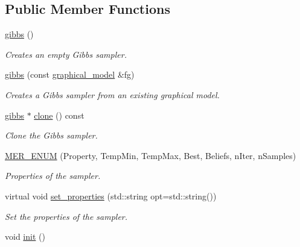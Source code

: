 \subsection*{Public Member Functions}
\begin{DoxyCompactItemize}
\item 
\hypertarget{classmerlin_1_1gibbs_a1513d2c6b58be4e4dd0e31c66d948e20}{}\hyperlink{classmerlin_1_1gibbs_a1513d2c6b58be4e4dd0e31c66d948e20}{gibbs} ()\label{classmerlin_1_1gibbs_a1513d2c6b58be4e4dd0e31c66d948e20}

\begin{DoxyCompactList}\small\item\em Creates an empty Gibbs sampler. \end{DoxyCompactList}\item 
\hypertarget{classmerlin_1_1gibbs_accbce95053cf0e18167d863ca9d3b832}{}\hyperlink{classmerlin_1_1gibbs_accbce95053cf0e18167d863ca9d3b832}{gibbs} (const \hyperlink{classmerlin_1_1graphical__model}{graphical\+\_\+model} \&fg)\label{classmerlin_1_1gibbs_accbce95053cf0e18167d863ca9d3b832}

\begin{DoxyCompactList}\small\item\em Creates a Gibbs sampler from an existing graphical model. \end{DoxyCompactList}\item 
\hyperlink{classmerlin_1_1gibbs}{gibbs} $\ast$ \hyperlink{classmerlin_1_1gibbs_a3479cca656a53a22c32ecdaa1a010308}{clone} () const 
\begin{DoxyCompactList}\small\item\em Clone the Gibbs sampler. \end{DoxyCompactList}\item 
\hypertarget{classmerlin_1_1gibbs_ad5abcb247d1b175e7feb503654dcf047}{}\hyperlink{classmerlin_1_1gibbs_ad5abcb247d1b175e7feb503654dcf047}{M\+E\+R\+\_\+\+E\+N\+U\+M} (Property, Temp\+Min, Temp\+Max, Best, Beliefs, n\+Iter, n\+Samples)\label{classmerlin_1_1gibbs_ad5abcb247d1b175e7feb503654dcf047}

\begin{DoxyCompactList}\small\item\em Properties of the sampler. \end{DoxyCompactList}\item 
virtual void \hyperlink{classmerlin_1_1gibbs_ab3981d10b8a378c2979a1dbb58893df1}{set\+\_\+properties} (std\+::string opt=std\+::string())
\begin{DoxyCompactList}\small\item\em Set the properties of the sampler. \end{DoxyCompactList}\item 
\hypertarget{classmerlin_1_1gibbs_ac14684f895fc27b59f318632a786acb7}{}void \hyperlink{classmerlin_1_1gibbs_ac14684f895fc27b59f318632a786acb7}{init} ()\label{classmerlin_1_1gibbs_ac14684f895fc27b59f318632a786acb7}


\end{DoxyCompactItemize}
